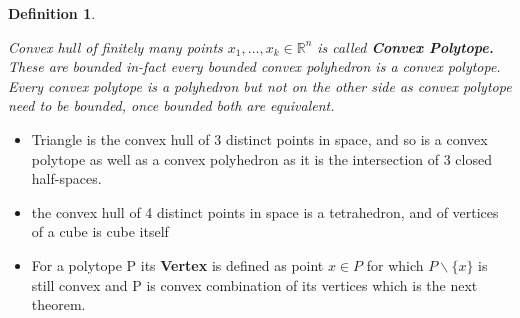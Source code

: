 \documentclass[oneside]{book}
\newtheorem{mydef}{Definition}
\begin{document}
  \begin{mydef} \label{d:6}
  
  Convex hull of finitely many points $x_1,\ldots ,x_k \in \mathbb{R}^n $ is called \textbf{Convex Polytope.} 
 These are bounded in-fact every bounded convex polyhedron  is a convex polytope.\\
  Every convex polytope is a polyhedron but not on the other side as convex polytope need to be bounded, once bounded both are equivalent.
 
 
  \end{mydef}
  

\begin{itemize}
\item

Triangle is the convex hull of 3 distinct points in space, and so is a convex polytope as well as a convex polyhedron as it is the intersection of 3 closed half-spaces.

\item
  the convex hull of 4 distinct points in space is a tetrahedron, and of vertices of a cube is cube itself 
 
 \item
 For a polytope P its \textbf{Vertex} is defined as point $x \in P$ for which $P \backslash \{x\} $ is  still convex and P is convex combination of its vertices which is  the next theorem. 
 \end{itemize}
\end{document}
